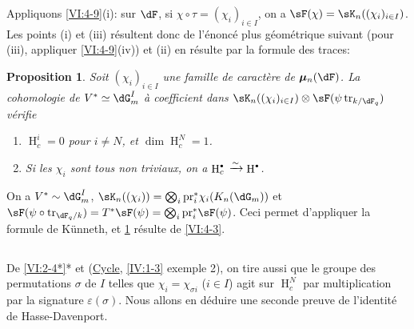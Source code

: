 \documentclass[oneside]{book}
\DeclareMathOperator{\h}{H}
\DeclareMathOperator{\tr}{tr}
\newcommand{\dmu}{{\bm\mu}}
\newcommand{\iso}{\xrightarrow\sim}
\newcommand{\pr}{\mathrm{pr}} %
\theoremstyle{sga-source}
\theoremstyle{sga-source-dash}
\theoremstyle{sga-source-dotdash}
\theoremstyle{sga-source-number-note-dash}
\theoremstyle{sga-source-note-number-dotdash}
\theoremstyle{sga-source-example-dotdash}
\theoremstyle{sga-source-inline-number}
\theoremstyle{sga-source-bare-number}
\theoremstyle{sga-source}
\newtheorem{proposition_}[subsection]{Proposition}
\let\oldbullet\bullet
\renewcommand{\bullet}{\textnormal{\tiny$\oldbullet$}}
\newcommand{\PrintPage}[1]{}\newcommand{\MathPage}[1]{}\newcommand{\PrintCite}[2]{#1}\newcommand{\var}[3]{#1}
\begin{document}
Appliquons \ref{VI:4-9}(i): sur $\dF$, si $\chi\circ \tau=(\chi_i)_{i\in I}$, 
on a $\sF(\chi) = \sK_n((\chi_i)_{i\in I})$. Les points (i) et (iii) 
résultent donc de l'énoncé plus géométrique suivant (pour (iii), 
appliquer \ref{VI:4-9}(iv)) et (ii) en résulte par la formule des traces: 





\begin{proposition_}\label{VI:4-11}
Soit $(\chi_i)_{i\in I}$ \var{une famille de caractère}{une famille de caractères}{S45-SOL-0826} de $\dmu_n(\dF)$. La 
cohomologie de $V^\ast\simeq \dG_m^I$ à coefficient dans 
$\sK_n((\chi_i)_{i\in I})\otimes \sF(\psi\tr_{k/\dF_q})$ vérifie 
\begin{enumerate}[\indent (i)]
  \item $\h_c^i{}=0$ pour $i\ne N$, et $\dim \h_c^N{} = 1$. 
  \item Si les $\chi_i$ sont tous non triviaux, on a 
    $\h_c^\bullet{}\iso \h^\bullet$. 
\end{enumerate}
\end{proposition_}

\PrintPage{202}
On a $V^\ast\sim \dG_m^I$, 
$\sK_n((\chi_i)) = \bigotimes_i \pr_i^\ast \chi_i(K_n(\dG_m))$ et 
$\sF(\psi\circ \var{\tr_{\dF_q/k}}{\tr_{k/\dF_q}}{S45-SOL-0828})=T^\ast \sF(\psi) = \bigotimes_i \pr_i^\ast \sF(\psi)$. 
Ceci permet d'appliquer la formule de K\"unneth, et \ref{VI:4-11} résulte de 
\ref{VI:4-3}. 





\subsection{}\label{VI:4-12}

De \ref{VI:2-4*}* et (\hyperref[IV]{Cycle}, \ref{IV:1-3} exemple 2), on tire 
aussi que le groupe des permutations $\sigma$ de $I$ telles que 
$\chi_i = \chi_{\sigma i}$ ($i\in I$) agit sur $\h_c^N$ par multiplication par 
la signature $\varepsilon(\sigma)$. Nous allons en déduire une seconde preuve 
de l'identité de Hasse-Davenport. 
\end{document}
